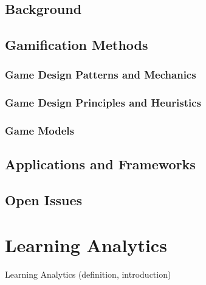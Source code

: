 \documentclass[10pt]{article}
\begin{document}
\subsection{Background}


\subsection{Gamification Methods}

\subsubsection{Game Design Patterns and Mechanics}

\subsubsection{Game Design Principles and Heuristics}

\subsubsection{Game Models}


\subsection{Applications and Frameworks}


\subsection{Open Issues}




\section{Learning Analytics}
Learning Analytics (definition, introduction)
\end{document}
